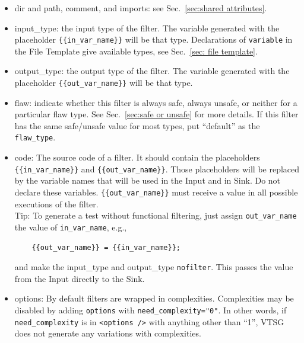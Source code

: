 \begin{itemize}
    \item dir and path, comment, and imports: see Sec.~\ref{sec:shared attributes}.

    \item input\_type: the input type of the filter. The variable 
    generated with
    the placeholder \verb|{{in_var_name}}| will be that type.
    Declarations of \verb|variable| in the File Template give
    available types, see Sec.~\ref{sec: file template}.

    \item output\_type: the output type of the filter.  The variable generated
    with the placeholder \verb|{{out_var_name}}| will be that type.

    \item flaw: indicate whether this filter is always safe, always unsafe, or
      neither for a particular flaw type.  See Sec.~\ref{sec:safe or unsafe} for
      more details.  If this filter has the same safe/unsafe value for most
      types, put ``default'' as the \verb|flaw_type|.

    \item code: The source code of a filter. It should contain the placeholders
    \\
    \verb|{{in_var_name}}| and \verb|{{out_var_name}}|.  Those placeholders will 
    be replaced by the variable names that will be used in the Input and in Sink.  Do
    not declare these variables.
    \verb|{{out_var_name}}| must receive a value in all possible executions of the
    filter.
    \\
    Tip: To generate a test without functional filtering, just assign
    \verb|out_var_name| the value of \verb|in_var_name|, e.g.,
\begin{verbatim}
    {{out_var_name}} = {{in_var_name}};
\end{verbatim}
    and make the input\_type and output\_type \verb|nofilter|.
    This passes the value from the Input directly to the Sink.

    \item options: By default filters are wrapped in complexities.  Complexities may
      be disabled by adding \verb|options| with \verb|need_complexity="0"|.
      \label{sec:need complexity}
      In other words, if \linebreak[4] \verb|need_complexity| is in
      \verb|<options />| with anything other than ``1'', VTSG does not generate any
      variations with complexities.
\end{itemize}

